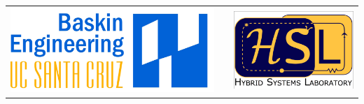 \documentclass[final]{beamer}
\newlength{\onecolwid}
\begin{document}
\begin{frame}[t]
\begin{columns}[t]
\begin{column}{\onecolwid}

\begin{center}
\begin{tabular}{ccc}
\includegraphics[width=0.4\linewidth]{images/baskin-logo-normal.jpg} & \hfill & \includegraphics[width=0.4\linewidth]{images/hsl-logo.png}
\end{tabular}
\end{center}


\end{column} %

\end{columns} %

\end{frame} %
\end{document}
